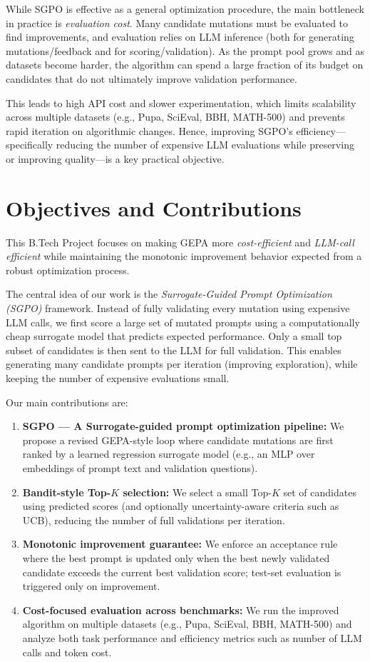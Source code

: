 While SGPO is effective as a general optimization procedure, the main bottleneck in practice is \emph{evaluation cost}. Many candidate mutations must be evaluated to find improvements, and evaluation relies on LLM inference (both for generating mutations/feedback and for scoring/validation). As the prompt pool grows and as datasets become harder, the algorithm can spend a large fraction of its budget on candidates that do not ultimately improve validation performance.

This leads to high API cost and slower experimentation, which limits scalability across multiple datasets (e.g., Pupa, SciEval, BBH, MATH-500) and prevents rapid iteration on algorithmic changes. Hence, improving SGPO's efficiency---specifically reducing the number of expensive LLM evaluations while preserving or improving quality---is a key practical objective.

\section{Objectives and Contributions}
This B.Tech Project focuses on making GEPA more \emph{cost-efficient} and \emph{LLM-call efficient} while maintaining the monotonic improvement behavior expected from a robust optimization process.

The central idea of our work is the \emph{Surrogate-Guided Prompt Optimization (SGPO)} framework. Instead of fully validating every mutation using expensive LLM calls, we first score a large set of mutated prompts using a computationally cheap surrogate model that predicts expected performance. Only a small top subset of candidates is then sent to the LLM for full validation. This enables generating many candidate prompts per iteration (improving exploration), while keeping the number of expensive evaluations small.

Our main contributions are:
\begin{enumerate}
    \item \textbf{SGPO — A Surrogate-guided prompt optimization pipeline:} We propose a revised GEPA-style loop where candidate mutations are first ranked by a learned regression surrogate model (e.g., an MLP over embeddings of prompt text and validation questions).
    \item \textbf{Bandit-style Top-$K$ selection:} We select a small Top-$K$ set of candidates using predicted scores (and optionally uncertainty-aware criteria such as UCB), reducing the number of full validations per iteration.
    \item \textbf{Monotonic improvement guarantee:} We enforce an acceptance rule where the best prompt is updated only when the best newly validated candidate exceeds the current best validation score; test-set evaluation is triggered only on improvement.
    \item \textbf{Cost-focused evaluation across benchmarks:} We run the improved algorithm on multiple datasets (e.g., Pupa, SciEval, BBH, MATH-500) and analyze both task performance and efficiency metrics such as number of LLM calls and token cost.
\end{enumerate}


